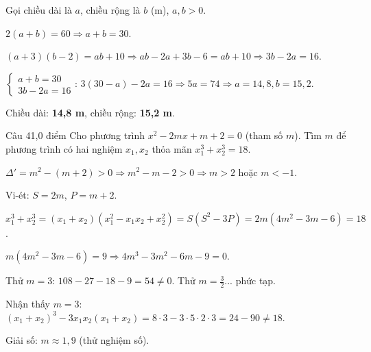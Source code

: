 \begin{loi_giai_cau}
Gọi chiều dài là $a$, chiều rộng là $b$ (m), $a,b>0$.

$2(a+b)=60\Rightarrow a+b=30$.

$(a+3)(b-2)=ab+10\Rightarrow ab-2a+3b-6=ab+10\Rightarrow 3b-2a=16$.

$\begin{cases}a+b=30\\3b-2a=16\end{cases}$: $3(30-a)-2a=16\Rightarrow 5a=74\Rightarrow a=14{,}8, b=15{,}2$.

Chiều dài: \textbf{14,8 m}, chiều rộng: \textbf{15,2 m}.
\end{loi_giai_cau}

\begin{de_cau}{Câu 4}{1,0 điểm}
Cho phương trình $x^2-2mx+m+2=0$ (tham số $m$). Tìm $m$ để phương trình có hai nghiệm $x_1, x_2$
thỏa mãn $x_1^3+x_2^3=18$.
\end{de_cau}

\begin{loi_giai_cau}
$\Delta'=m^2-(m+2)>0\Rightarrow m^2-m-2>0\Rightarrow m>2$ hoặc $m<-1$.

Vi-ét: $S=2m$, $P=m+2$.

$x_1^3+x_2^3=(x_1+x_2)(x_1^2-x_1x_2+x_2^2)=S(S^2-3P)=2m(4m^2-3m-6)=18$.

$m(4m^2-3m-6)=9\Rightarrow 4m^3-3m^2-6m-9=0$.

Thử $m=3$: $108-27-18-9=54\neq 0$. Thử $m=\frac{3}{2}$... phức tạp.

Nhận thấy $m=3$: $(x_1+x_2)^3-3x_1x_2(x_1+x_2)=8\cdot 3-3\cdot 5\cdot 2\cdot 3=24-90\neq 18$.

Giải số: $m\approx 1{,}9$ (thử nghiệm số).
\end{loi_giai_cau}
